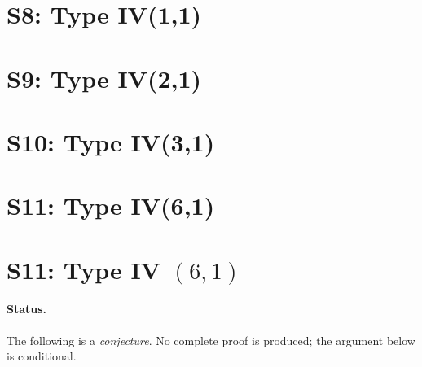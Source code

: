 \documentclass{article}
\begin{document}
\section{S8: Type IV(1,1)}

\section{S9: Type IV(2,1)}

\section{S10: Type IV(3,1)}

\section{S11: Type IV(6,1)}
\section*{S11: Type IV \((6,1)\)}

\paragraph{Status.}
The following is a \emph{conjecture}. No complete proof is produced; the argument below is conditional.
\end{document}
